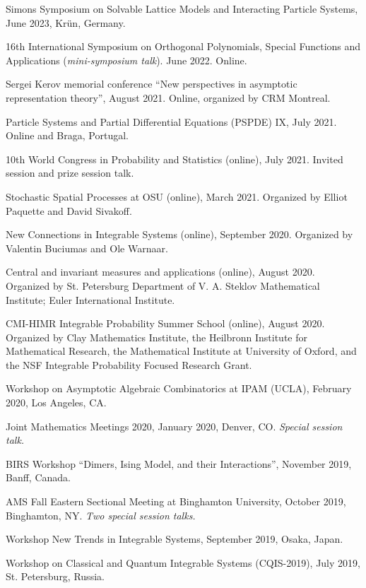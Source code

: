\documentclass[letterpaper,11pt]{article}
\begin{document}
\begin{etaremune}
	\item 
	Simons Symposium on Solvable Lattice Models and Interacting Particle Systems,
	June 2023, Kr\"un, Germany.
	\item 
	16th International Symposium on Orthogonal Polynomials, Special Functions and Applications (\emph{mini-symposium talk}).
	June 2022. Online.
\item
	Sergei Kerov memorial conference
	``New perspectives in asymptotic representation theory'',
	August 2021. Online, organized by CRM Montreal.
\item 
	Particle Systems and Partial Differential Equations (PSPDE) IX,
	July 2021. Online and Braga, Portugal.
\item 
	10th World Congress in Probability and Statistics (online),
	July 2021.
	Invited session and prize session talk. 
\item
	Stochastic Spatial Processes at OSU (online),
	March 2021. 
	Organized by Elliot Paquette and David Sivakoff.
\item New Connections in Integrable Systems (online),
	September 2020. 
	Organized by Valentin Buciumas and Ole Warnaar.
\item
	Central and invariant measures and applications (online),
	August 2020.
	Organized by St. Petersburg Department of V. A. Steklov Mathematical Institute; Euler International Institute.
\item
	CMI-HIMR Integrable Probability Summer School (online),
	August 2020.
	Organized by 
	Clay Mathematics Institute, the Heilbronn Institute for Mathematical Research, 
	the Mathematical Institute at University of Oxford, 
	and the NSF Integrable Probability Focused Research Grant.
\item
	Workshop on Asymptotic Algebraic Combinatorics at
	IPAM (UCLA), February 2020,
	Los Angeles, CA.
\item Joint Mathematics Meetings 2020,
	January 2020, 
	Denver, CO. 
	\emph{Special session talk.}
	\item
		BIRS Workshop ``Dimers, Ising Model, and their Interactions'',
		November 2019, Banff, Canada.
	\item AMS Fall Eastern Sectional Meeting
	at 
	Binghamton University, 
	October 2019,
	Binghamton, NY.
	\emph{Two special session talks.}
	\item 
		Workshop New Trends in Integrable Systems, 
		September 2019, Osaka, Japan.
	\item 
		Workshop on Classical and Quantum Integrable
		Systems (CQIS-2019), July 2019, St. Petersburg, Russia.

\end{etaremune}
\end{document}
